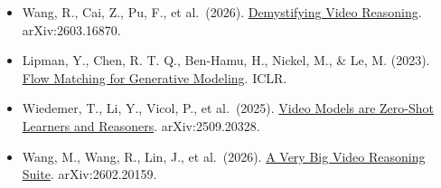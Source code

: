 \vspace{0.25em}
\begin{itemize}
\tightlist
\item
  Wang, R., Cai, Z., Pu, F., et al.~(2026). \href{https://arxiv.org/abs/2603.16870}{Demystifying Video Reasoning}. arXiv:2603.16870.
\item
  Lipman, Y., Chen, R. T. Q., Ben-Hamu, H., Nickel, M., \& Le, M. (2023). \href{https://arxiv.org/abs/2210.02747}{Flow Matching for Generative Modeling}. ICLR.
\item
  Wiedemer, T., Li, Y., Vicol, P., et al.~(2025). \href{https://arxiv.org/abs/2509.20328}{Video Models are Zero-Shot Learners and Reasoners}. arXiv:2509.20328.
\item
  Wang, M., Wang, R., Lin, J., et al.~(2026). \href{https://arxiv.org/abs/2602.20159}{A Very Big Video Reasoning Suite}. arXiv:2602.20159.
\end{itemize}

\clearpage

